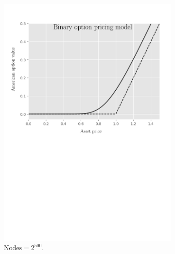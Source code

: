 \begin{figure}[tbp]
  \centering
  \begin{subfigure}{0.4\textwidth}
    \centering
    \includegraphics[width=\textwidth]{chapters/chapter3/TestCase1BOPM.pdf}
    \caption{$\text{Nodes} = 2^{500}$.}
    \label{fig:finitedifferencesschemes:numericaresults:test_case_1_bopm}
  \end{subfigure}
  \hspace{0.5cm}
  \begin{subfigure}{0.4\textwidth}
    \centering

\end{subfigure}
\end{figure}
